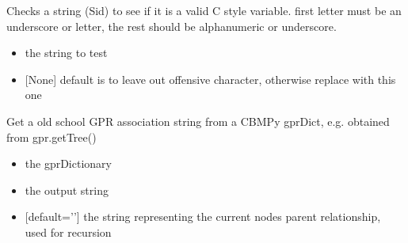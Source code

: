 \documentclass[letterpaper,10pt,english]{sphinxmanual}
\begin{document}

\begin{fulllineitems}
\label{\detokenize{modules_doc:cbmpy.CBCommon.fixId}}
\pysigstartsignatures
{}
\pysigstopsignatures
\sphinxAtStartPar
Checks a string (Sid) to see if it is a valid C style variable. first letter must be an underscore or letter,
the rest should be alphanumeric or underscore.
\begin{itemize}
\item {} 
\sphinxAtStartPar
{} the string to test

\item {} 
\sphinxAtStartPar
{} {[}None{]} default is to leave out offensive character, otherwise replace with this one

\end{itemize}

\end{fulllineitems}


\begin{fulllineitems}
\label{\detokenize{modules_doc:cbmpy.CBCommon.func_getAssociationStrFromGprDict}}
\pysigstartsignatures
{}
\pysigstopsignatures
\sphinxAtStartPar
Get a old school GPR association string from a CBMPy gprDict, e.g. obtained from gpr.getTree()
\begin{itemize}
\item {} 
\sphinxAtStartPar
{} the gprDictionary

\item {} 
\sphinxAtStartPar
{} the output string

\item {} 
\sphinxAtStartPar
{} {[}default=’’{]} the string representing the current nodes parent relationship, used for recursion

\end{itemize}

\end{fulllineitems}
\end{document}
